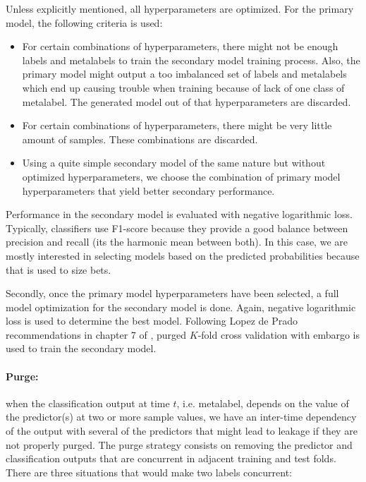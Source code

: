Unless explicitly mentioned, all hyperparameters are optimized. For the primary model,
the following criteria is used:

\begin{itemize}
  \item For certain combinations of hyperparameters, there might not be
        enough labels and metalabels to train the secondary model training process.
        Also, the primary model might output a too imbalanced set of labels and
        metalabels which end up causing trouble when training because of lack of
        one class of metalabel. The generated model out of that hyperparameters are
        discarded. 
  \item For certain combinations of hyperparameters, there might be very little
        amount of samples. These combinations are discarded.
  \item Using a quite simple secondary model of the same nature but without
        optimized hyperparameters, we choose the combination of primary model
        hyperparameters that yield better secondary performance.
\end{itemize}

Performance in the secondary model is evaluated with negative logarithmic loss.
Typically, classifiers use F1-score because they provide a good balance between
precision and recall (its the harmonic mean between both). In this case, we are
mostly interested in selecting models based on the predicted probabilities
because that is used to size bets.

Secondly, once the primary model hyperparameters have been selected, a full
model optimization for the secondary model is done. Again, negative logarithmic loss is
used to determine the best model. Following Lopez de Prado recommendations in
chapter 7 of \cite{lopez_de_prado}, purged $K$-fold cross validation with embargo
is used to train the secondary model.

\paragraph{Purge:} when the classification output at time $t$, i.e. metalabel,
depends on the value of the predictor(s) at two or more sample values, we have
an inter-time dependency of the output with several of the predictors that might
lead to leakage if they are not properly purged. The purge strategy consists on
removing the predictor and classification outputs that are concurrent in
adjacent training and test folds. There are three situations that would make two
labels concurrent:


